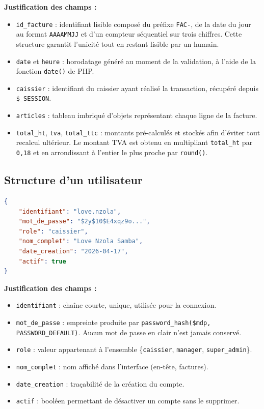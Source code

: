 \documentclass[12pt,a4paper]{article}
\begin{document}
\textbf{Justification des champs :}
\begin{itemize}[leftmargin=1.5em]
    \item \texttt{id\_facture} : identifiant lisible composé du préfixe \texttt{FAC-}, de la date du jour au format \texttt{AAAAMMJJ} et d'un compteur séquentiel sur trois chiffres. Cette structure garantit l'unicité tout en restant lisible par un humain.
    \item \texttt{date} et \texttt{heure} : horodatage généré au moment de la validation, à l'aide de la fonction \texttt{date()} de PHP.
    \item \texttt{caissier} : identifiant du caissier ayant réalisé la transaction, récupéré depuis \texttt{\$\_SESSION}.
    \item \texttt{articles} : tableau imbriqué d'objets représentant chaque ligne de la facture.
    \item \texttt{total\_ht}, \texttt{tva}, \texttt{total\_ttc} : montants pré-calculés et stockés afin d'éviter tout recalcul ultérieur. Le montant TVA est obtenu en multipliant \texttt{total\_ht} par \texttt{0,18} et en arrondissant à l'entier le plus proche par \texttt{round()}.
\end{itemize}

\subsection{Structure d'un utilisateur}

\begin{lstlisting}[language=json, caption={Exemple d'enregistrement d'un utilisateur}]
{
    "identifiant": "love.nzola",
    "mot_de_passe": "$2y$10$E4xqz9o...",
    "role": "caissier",
    "nom_complet": "Love Nzola Samba",
    "date_creation": "2026-04-17",
    "actif": true
}
\end{lstlisting}

\textbf{Justification des champs :}
\begin{itemize}[leftmargin=1.5em]
    \item \texttt{identifiant} : chaîne courte, unique, utilisée pour la connexion.
    \item \texttt{mot\_de\_passe} : empreinte produite par \texttt{password\_hash(\$mdp, PASSWORD\_DEFAULT)}. Aucun mot de passe en clair n'est jamais conservé.
    \item \texttt{role} : valeur appartenant à l'ensemble \{\texttt{caissier}, \texttt{manager}, \texttt{super\_admin}\}.
    \item \texttt{nom\_complet} : nom affiché dans l'interface (en-tête, factures).
    \item \texttt{date\_creation} : traçabilité de la création du compte.
    \item \texttt{actif} : booléen permettant de désactiver un compte sans le supprimer.
\end{itemize}
\end{document}
